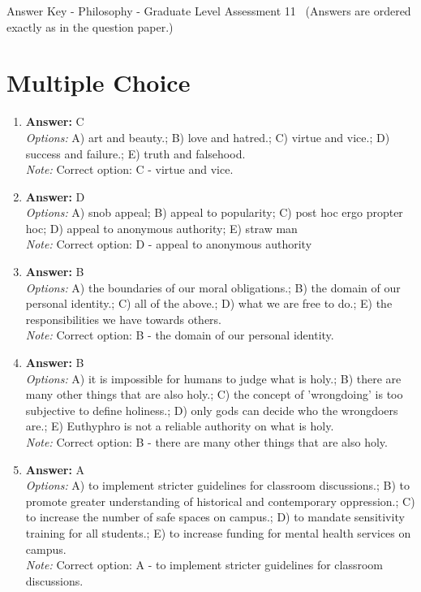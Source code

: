 \documentclass[12pt]{article}
\begin{document}
\begin{center}
Answer Key - Philosophy - Graduate Level Assessment 11 \
\small (Answers are ordered exactly as in the question paper.)
\end{center}

\section*{Multiple Choice}
\begin{enumerate}[label=\arabic*.]
\item \textbf{Answer:} C
\\ \textit{Options:} A) art and beauty.; B) love and hatred.; C) virtue and vice.; D) success and failure.; E) truth and falsehood.
\\ \textit{Note:} Correct option: C - virtue and vice.
\item \textbf{Answer:} D
\\ \textit{Options:} A) snob appeal; B) appeal to popularity; C) post hoc ergo propter hoc; D) appeal to anonymous authority; E) straw man
\\ \textit{Note:} Correct option: D - appeal to anonymous authority
\item \textbf{Answer:} B
\\ \textit{Options:} A) the boundaries of our moral obligations.; B) the domain of our personal identity.; C) all of the above.; D) what we are free to do.; E) the responsibilities we have towards others.
\\ \textit{Note:} Correct option: B - the domain of our personal identity.
\item \textbf{Answer:} B
\\ \textit{Options:} A) it is impossible for humans to judge what is holy.; B) there are many other things that are also holy.; C) the concept of 'wrongdoing' is too subjective to define holiness.; D) only gods can decide who the wrongdoers are.; E) Euthyphro is not a reliable authority on what is holy.
\\ \textit{Note:} Correct option: B - there are many other things that are also holy.
\item \textbf{Answer:} A
\\ \textit{Options:} A) to implement stricter guidelines for classroom discussions.; B) to promote greater understanding of historical and contemporary oppression.; C) to increase the number of safe spaces on campus.; D) to mandate sensitivity training for all students.; E) to increase funding for mental health services on campus.
\\ \textit{Note:} Correct option: A - to implement stricter guidelines for classroom discussions.
\end{enumerate}
\end{document}
